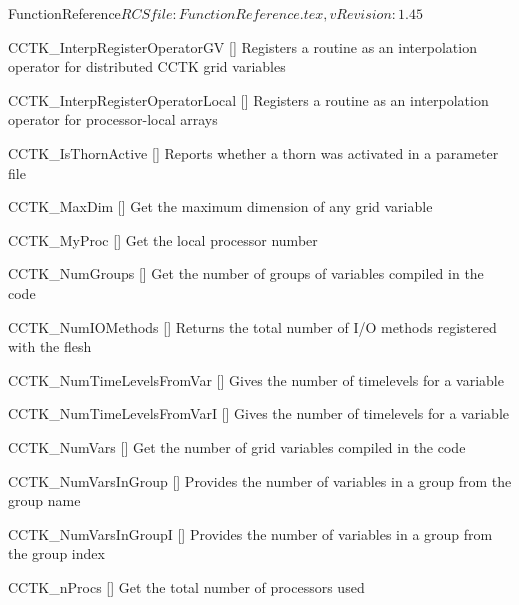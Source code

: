 \begin{cactuspart}{5}{FunctionReference}{$RCSfile: FunctionReference.tex,v $}{$Revision: 1.45 $}
\begin{Lentry}
\item[CCTK\_InterpRegisterOperatorGV]
  [\pageref{CCTK-InterpRegisterOperatorGV}]
  Registers a routine as an interpolation operator for distributed CCTK grid variables

\item[CCTK\_InterpRegisterOperatorLocal]
  [\pageref{CCTK-InterpRegisterOperatorLocal}]
  Registers a routine as an interpolation operator for processor-local arrays

\item[CCTK\_IsThornActive]
  [\pageref{CCTK-IsThornActive}]
  Reports whether a thorn was activated in a parameter file

\item[CCTK\_MaxDim]
  [\pageref{CCTK-MaxDim}]
  Get the maximum dimension of any grid variable

\item[CCTK\_MyProc]
  [\pageref{CCTK-MyProc}]
  Get the local processor number

\item[CCTK\_NumGroups]
  [\pageref{CCTK-NumGroups}]
  Get the number of groups of variables compiled in the code

\item[CCTK\_NumIOMethods]
  [\pageref{CCTK-NumIOMethods}]
  Returns the total number of I/O methods registered with the flesh

\item[CCTK\_NumTimeLevelsFromVar]
  [\pageref{CCTK-NumTimeLevelsFromVar}]
  Gives the number of timelevels for a variable

\item[CCTK\_NumTimeLevelsFromVarI]
  [\pageref{CCTK-NumTimeLevelsFromVarI}]
  Gives the number of timelevels for a variable

\item[CCTK\_NumVars]
  [\pageref{CCTK-NumVars}]
  Get the number of grid variables compiled in the code

\item[CCTK\_NumVarsInGroup]
  [\pageref{CCTK-NumVarsInGroup}]
  Provides the number of variables in a group from the group name

\item[CCTK\_NumVarsInGroupI]
  [\pageref{CCTK-NumVarsInGroupI}]
  Provides the number of variables in a group from the group index

\item[CCTK\_nProcs]
  [\pageref{CCTK-nProcs}]
  Get the total number of processors used


\end{Lentry}
\end{cactuspart}
